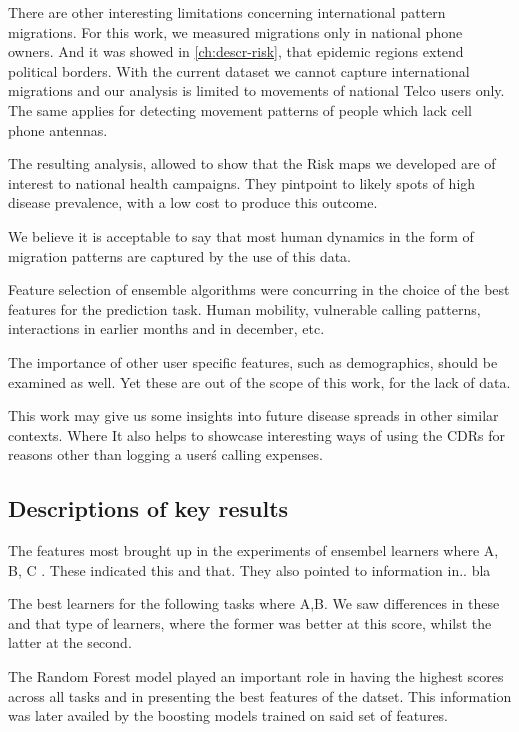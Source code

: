 There are other interesting limitations concerning international pattern migrations.
For this work, we measured migrations only in national phone owners.
And it was showed in \cref{ch:descr-risk}, that  epidemic regions extend political borders.
With the current dataset we cannot capture international migrations and our analysis is limited to movements of national Telco users only.
The same applies for detecting movement patterns of people which lack cell phone antennas.

The resulting analysis, allowed to show that the Risk maps we developed are of interest to national health campaigns.
They pintpoint to likely spots of high disease prevalence, with a low cost to produce this outcome.







We believe it is acceptable to say that most human dynamics in the form of migration patterns are captured by the use of this data.

Feature selection of ensemble algorithms were concurring in the choice of the best features for the prediction task.
Human mobility, vulnerable calling patterns, interactions in earlier months and in december, etc.


The importance of other user specific features, such as demographics, should be examined as well.
Yet these are out of the scope of this work, for the lack of data.


This work may give us some insights into future disease spreads in other similar contexts.
Where
It also helps to showcase interesting ways of using the CDRs for reasons other than logging a user\'s calling expenses.


\subsection{Descriptions of key results}



The features most brought up in the experiments of ensembel learners where A, B, C .
These indicated this and that.
They also pointed to information in.. bla


The best learners for the following tasks where A,B.
We saw differences in these and that type of learners, where the former was better at this score, whilst the latter at the second.

The Random Forest model played an important role in having the highest scores across all tasks and in presenting the best features of the datset.
This information was later availed by the boosting models trained on said set of features.











